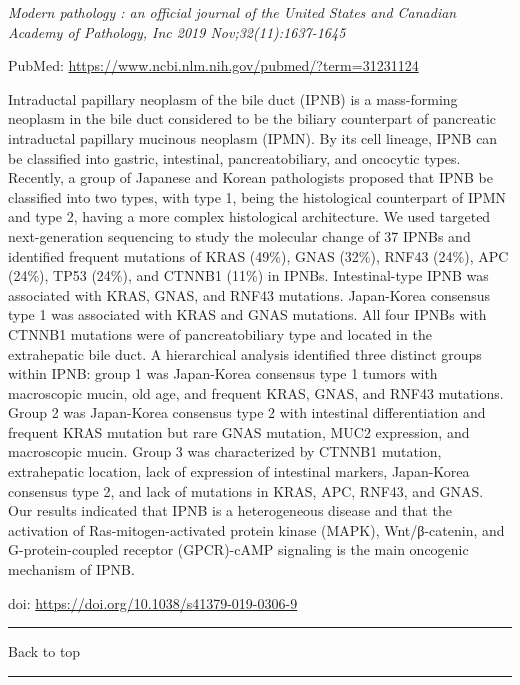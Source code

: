 \documentclass[
]{article}
\renewcommand{\linethickness}{0.05em}
\begin{document}
\emph{Modern pathology : an official journal of the United States and
Canadian Academy of Pathology, Inc 2019 Nov;32(11):1637-1645}

PubMed: \url{https://www.ncbi.nlm.nih.gov/pubmed/?term=31231124}

Intraductal papillary neoplasm of the bile duct (IPNB) is a mass-forming
neoplasm in the bile duct considered to be the biliary counterpart of
pancreatic intraductal papillary mucinous neoplasm (IPMN). By its cell
lineage, IPNB can be classified into gastric, intestinal,
pancreatobiliary, and oncocytic types. Recently, a group of Japanese and
Korean pathologists proposed that IPNB be classified into two types,
with type 1, being the histological counterpart of IPMN and type 2,
having a more complex histological architecture. We used targeted
next-generation sequencing to study the molecular change of 37 IPNBs and
identified frequent mutations of KRAS (49\%), GNAS (32\%), RNF43 (24\%),
APC (24\%), TP53 (24\%), and CTNNB1 (11\%) in IPNBs. Intestinal-type
IPNB was associated with KRAS, GNAS, and RNF43 mutations. Japan-Korea
consensus type 1 was associated with KRAS and GNAS mutations. All four
IPNBs with CTNNB1 mutations were of pancreatobiliary type and located in
the extrahepatic bile duct. A hierarchical analysis identified three
distinct groups within IPNB: group 1 was Japan-Korea consensus type 1
tumors with macroscopic mucin, old age, and frequent KRAS, GNAS, and
RNF43 mutations. Group 2 was Japan-Korea consensus type 2 with
intestinal differentiation and frequent KRAS mutation but rare GNAS
mutation, MUC2 expression, and macroscopic mucin. Group 3 was
characterized by CTNNB1 mutation, extrahepatic location, lack of
expression of intestinal markers, Japan-Korea consensus type 2, and lack
of mutations in KRAS, APC, RNF43, and GNAS. Our results indicated that
IPNB is a heterogeneous disease and that the activation of
Ras-mitogen-activated protein kinase (MAPK), Wnt/β-catenin, and
G-protein-coupled receptor (GPCR)-cAMP signaling is the main oncogenic
mechanism of IPNB.

doi: \url{https://doi.org/10.1038/s41379-019-0306-9}

\begin{center}\rule{0.5\linewidth}{\linethickness}\end{center}

Back to top

\begin{center}\rule{0.5\linewidth}{\linethickness}\end{center}
\end{document}
